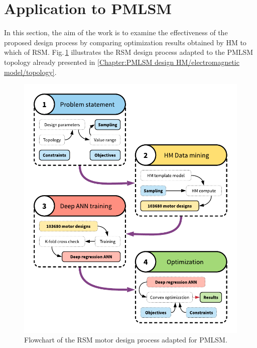     \section{Application to \ac{PMLSM}}             \label{Chapter:RSM/PMLSM}
    
        
        In this section, the aim of the work is to examine the effectiveness of the proposed design process by comparing optimization results obtained by \acs{HM} to which of \acs{RSM}. Fig.\,\ref{fig:chapter/rsm/PMLSM optimization} illustrates the \acs{RSM} design process adapted to the \acs{PMLSM} topology already presented in \ref{Chapter:PMLSM design HM/electromagnetic model/topology}. 
        
        
        \begin{figure}[h]
            \centering
            \includegraphics[width=4.5in]{chap4/images/optimization_process_RSM_for_PMLSM.pdf}
            \caption{Flowchart of the RSM motor design process adapted for PMLSM.}
            \label{fig:chapter/rsm/PMLSM optimization}
        \end{figure}
        
